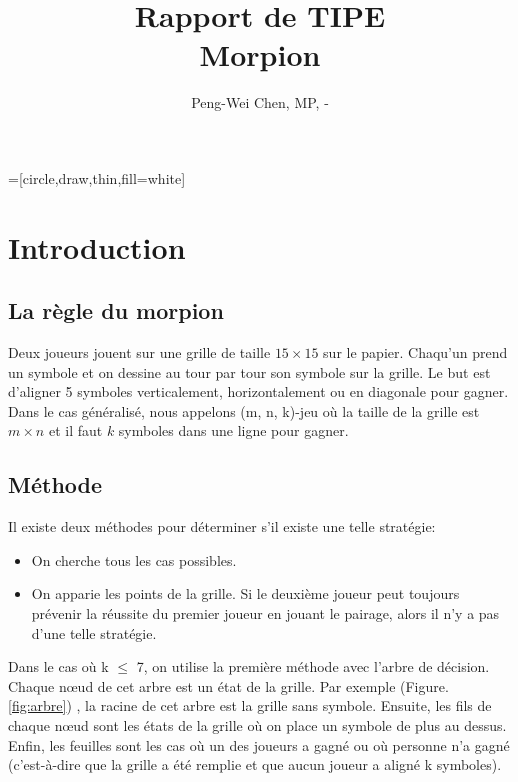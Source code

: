 \documentclass[12pt, a4paper]{article}
\title{Rapport de TIPE\\
Morpion}
\author{Peng-Wei Chen, MP, \oldstylenums{2017}-\oldstylenums{2018}}
\begin{document}
\maketitle
{}=[circle,draw,thin,fill=white]

\section{Introduction}
\subsection{La règle du morpion}
Deux joueurs jouent sur une grille de taille $15 \times 15$ sur le papier. Chaqu'un prend un symbole et on dessine au tour par tour son symbole sur la grille. Le but est d'aligner 5 symboles verticalement, horizontalement ou en diagonale pour gagner.
Dans le cas généralisé, nous appelons (m, n, k)-jeu où la taille de la grille est $m \times n$ et il faut $k$ symboles dans une ligne pour gagner.
\subsection{Méthode}
Il existe deux méthodes pour déterminer s'il existe une telle stratégie:
\begin{itemize}
    \item On cherche tous les cas possibles.
    \item On apparie les points de la grille. Si le deuxième joueur peut toujours prévenir la réussite du premier joueur en jouant le pairage, alors il n'y a pas d'une telle stratégie.
\end{itemize}

Dans le cas où k $\le$ 7, on utilise la première méthode avec l'arbre de décision. Chaque nœud de cet arbre est un état de la grille. Par exemple (Figure. \ref{fig:arbre}) , la racine de cet arbre est la grille sans symbole. Ensuite, les fils de chaque nœud sont les états de la grille où on place un symbole de plus au dessus. Enfin, les feuilles sont les cas où un des joueurs a gagné ou où personne n'a gagné (c'est-à-dire que la grille a été remplie et que aucun joueur a aligné k symboles).
\end{document}
